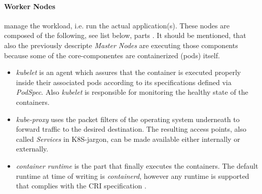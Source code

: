\documentclass[MSC,Master,english]{twbook}%
\begin{document}
\paragraph{Worker Nodes} manage the workload, i.e. run the actual application(s). These nodes are composed of the following, see list below, parts \cite{k8scomp}. It should be mentioned, that also the previously descripte \textit{Master Nodes} are executing those components because some of the core-componentes are containerized (pods) itself. 
\begin{itemize}
    \item \textit{kubelet} is an agent which assures that the container is executed properly inside their associated pods according to its specifications defined via \textit{PodSpec}. Also \textit{kubelet} is responsible for monitoring the healthy state of the containers.
    \item \textit{kube-proxy} uses the packet filters of the operating system underneath to forward traffic to the desired destination. The resulting access points, also called \textit{Services} in \ac{K8S}-jargon, can be made available either internally or externally.
    \item \textit{container runtime} is the part that finally executes the containers. The default runtime at time of writing is \textit{containerd}, however any runtime is supported that complies with the CRI specification \cite{cri-runtime}.
\end{itemize}
\end{document}
